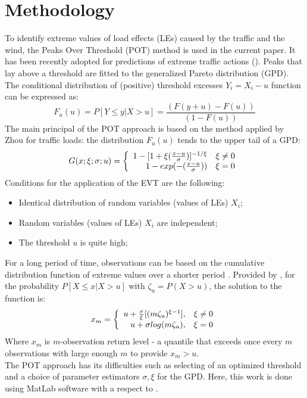 \documentclass[11pt,a4paper]{article}
\begin{document}
\section{Methodology}
\medskip
To identify extreme values of load effects (LEs) caused by the traffic and the wind, the Peaks Over Threshold (POT) method is used in the current paper. It has been recently adopted for predictions of extreme traffic actions (\cite{Zhou2013,Zhou2016}). Peaks that lay above a threshold are fitted to the generalized Pareto distribution (GPD). The conditional distribution of (positive) threshold excesses $Y_i=X_i-u$ function \cite{Coles2001} can be expressed as:
$$F_u (u)=P[Y\le y|X>u]=\frac{(F(y+u)-F(u))}{(1-F(u) )}$$
The main principal of the POT approach is based on the method applied by Zhou \cite{Zhou2013, Zhou2016} for traffic loads: the distribution $F_u (u)$ tends to the upper tail of a GPD:
\[
\mbox{$G(x;\xi;\sigma;u)$}=\left\{
\begin{array}{rl}
$$ 1 - [ 1 + \xi (\frac{x-u}{\sigma}) ]^{-1/\xi} $$ & $$\xi\not=0$$ \\
$$1 - exp{(-(\frac{x-u}{\sigma}))}$$ & $$\xi=0$$
\end{array} \right.
\]
Conditions for the application of the EVT are the following:
\begin{itemize}
	\item Identical distribution of random variables (values of LEs) $X_i$;
	\item Random variables (values of LEs) $X_i$ are independent;
	\item The threshold $u$ is quite high;
\end{itemize}
For a long period of time, observations can be based on the cumulative distribution function of extreme values over a shorter period \cite{Crespo1997}. Provided by \cite{Coles2001}, for the probability $P[X\le x|X>u]$ with
$\zeta_u=P(X>u)$, the solution to the function is:
\[
\mbox{$x_m$}=\left\{
\begin{array}{rl}
$$u+\frac{\sigma}{\xi}[(m\zeta_u)^{\xi -1}],$$ & $$\xi\not=0$$ \\
$$u+\sigma log{(m\zeta_u)},$$ & $$\xi=0$$ 
\end{array} \right.
\]
Where $x_m$ is $m$-observation return level - a quantile that exceeds once every $m$ observations with large enough $m$ to provide $x_m>u$.\\
The POT approach has its difficulties such as selecting of an optimized threshold and a choice of parameter estimators $\sigma, \xi$ for the GPD. Here, this work is done using MatLab software with a respect to \cite{Zhou2013, Coles2001}.
\end{document}
